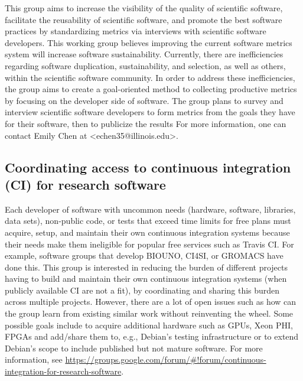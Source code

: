 \documentclass[11pt, oneside]{amsart}
\newcommand{\note}[1]{ {\textcolor{blueish}    { ***Note:      #1 }}}
\begin{document}
This group aims to increase the visibility of the quality of scientific software, facilitate the reusability of scientific software, and promote the best software practices by standardizing metrics via interviews with scientific software developers. This working group believes improving the current software metrics system will increase software sustainability. Currently, there are inefficiencies regarding software duplication, sustainability, and selection, as well as others, within the scientific software community. In order to address these inefficiencies, the group aims to create a goal-oriented method to collecting productive metrics by focusing on the developer side of software.
The group plans to survey and interview scientific software developers to form metrics from the goals they have for their software, then to publicize the results
%
For more information, one can contact Emily Chen at <echen35@illinois.edu>.



\subsection{Coordinating access to continuous integration (CI) for research software}
\label{sec:access}


Each developer of software with uncommon needs (hardware, software, libraries, data sets), non-public code, or tests that exceed time limits for free plans must acquire, setup, and maintain their own continuous integration systems because their needs make them ineligible for popular free services such as Travis CI.  For example, software groups that develop BIOUNO, CI4SI, or GROMACS have done this.
%
This group is interested in reducing the burden of different projects having to build and maintain their own continuous integration systems (when publicly available CI are not a fit), by coordinating and sharing this burden across multiple projects.
%
However, there are a lot of open issues such as how can the group learn from existing similar work without reinventing the wheel. Some possible goals include to acquire additional hardware such as GPUs, Xeon PHI, FPGAs and add/share them to, e.g., Debian's testing infrastructure or to extend Debian's scope to include published but not mature software.
%
For more information, see \url{https://groups.google.com/forum/#!forum/continuous-integration-for-research-software}.
\end{document}
